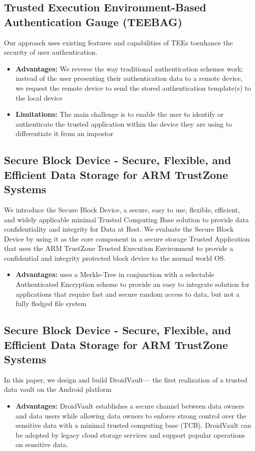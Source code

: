 \documentclass[conference]{IEEEtran}
\begin{document}
\subsection{Trusted Execution Environment-Based Authentication Gauge (TEEBAG)}
Our approach uses existing features and capabilities of TEEs toenhance the security of user authentication.
\begin{itemize}
    \item \textbf{Advantages:}  We reverse the way traditional authentication schemes work: instead of the user presenting their authentication data to a remote device, we request the remote device to send the stored authentication template(s) to the local device
    \item \textbf{Limitations:} The main challenge is to enable the user to identify or authenticate the trusted application within the device they are using to differentiate it from an impostor
\end{itemize}


\subsection{Secure Block Device - Secure, Flexible, and Efficient Data Storage for ARM TrustZone Systems}
We introduce the Secure Block Device, a secure, easy to use, flexible, efficient, and widely applicable minimal Trusted Computing Base solution to provide data confidentiality and integrity for Data at Rest. We evaluate the Secure Block Device by using it as the core component in a secure storage Trusted Application that uses the ARM TrustZone Trusted Execution Environment to provide a confidential and integrity protected block device to the normal world OS.
\begin{itemize}
    \item \textbf{Advantages:} uses a Merkle-Tree in conjunction with a selectable Authenticated Encryption scheme to provide an easy to integrate solution for applications that require fast and secure random access to data, but not a fully fledged file system
\end{itemize}


\subsection{Secure Block Device - Secure, Flexible, and Efficient Data Storage for ARM TrustZone Systems}
In this paper, we design and build DroidVault— the first realization of a trusted data vault on the Android platform
\begin{itemize}
    \item \textbf{Advantages:} DroidVault establishes a secure channel between data owners and data users while allowing data owners to enforce strong control over the sensitive data with a minimal trusted computing base (TCB). DroidVault can be adopted by legacy cloud storage services and support popular operations on sensitive data.
\end{itemize}
\end{document}
